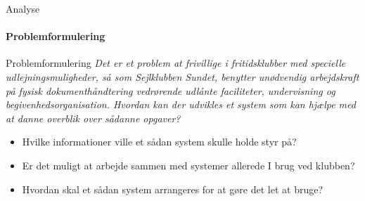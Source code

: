 \begin{frame}{Analyse}
\framesubtitle{Problemformulering}

\begin{beamerboxesrounded}[upper=headerCol,lower=bodyCol,shadow=true]{Problemformulering}
\textit{Det er et problem at frivillige i fritidsklubber med specielle udlejningsmuligheder, så som Sejlklubben Sundet, benytter unødvendig arbejdskraft på fysisk dokumenthåndtering vedrørende udlånte faciliteter, undervisning og begivenhedsorganisation. Hvordan kan der udvikles et system som kan hjælpe med at danne overblik over sådanne opgaver?}
\end{beamerboxesrounded}

  \begin{itemize}
  
    
    \item Hvilke informationer ville et sådan system skulle holde styr på?
    \item Er det muligt at arbejde sammen med systemer allerede I brug ved klubben?
    \item Hvordan skal et sådan system arrangeres for at gøre det let at bruge?
  \end{itemize}
\end{frame}